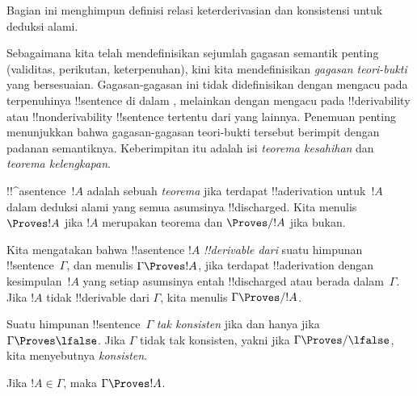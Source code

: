 \documentclass[../../../include/open-logic-section]{subfiles}
\begin{document}
      {}
      {}


\begin{editorial}
Bagian ini menghimpun definisi relasi keterderivasian dan konsistensi
untuk deduksi alami.
\end{editorial}

\begin{explain}
Sebagaimana kita telah mendefinisikan sejumlah gagasan semantik penting
(validitas, perikutan, keterpenuhan), kini kita mendefinisikan
\emph{gagasan teori-bukti} yang bersesuaian. Gagasan-gagasan ini tidak
didefinisikan dengan mengacu pada terpenuhinya !!{sentence} di dalam
, melainkan dengan mengacu pada
!!{derivability} atau !!{nonderivability} !!{sentence} tertentu dari
yang lainnya. Penemuan penting menunjukkan bahwa gagasan-gagasan
teori-bukti tersebut berimpit dengan padanan semantiknya. Keberimpitan itu
adalah isi \emph{teorema kesahihan} dan \emph{teorema kelengkapan}.
\end{explain}


\begin{defn}[Teorema]
!!^a{sentence}~$!A$ adalah sebuah \emph{teorema} jika terdapat
!!a{derivation} untuk~$!A$ dalam deduksi alami yang semua asumsinya
!!{discharged}. Kita menulis $\Proves !A$ jika $!A$ merupakan teorema dan
$\Proves/ !A$ jika bukan.
\end{defn}

\begin{defn}[!!^{derivability}]
Kita mengatakan bahwa !!a{sentence} $!A$ \emph{!!{derivable} dari} suatu
himpunan !!{sentence}~$\Gamma$, dan menulis $\Gamma \Proves !A$, jika
terdapat !!a{derivation} dengan kesimpulan~$!A$ yang setiap asumsinya
entah !!{discharged} atau berada dalam~$\Gamma$. Jika $!A$ tidak
!!{derivable} dari $\Gamma$, kita menulis $\Gamma \Proves/ !A$.
\end{defn}

\begin{defn}[Konsistensi]
Suatu himpunan !!{sentence}~$\Gamma$ \emph{tak konsisten} jika dan hanya
jika $\Gamma \Proves \lfalse$. Jika $\Gamma$ tidak tak konsisten, yakni
jika $\Gamma \Proves/ \lfalse$, kita menyebutnya \emph{konsisten}.
\end{defn}

\begin{prop}[Refleksivitas]
Jika $!A \in \Gamma$, maka $\Gamma \Proves !A$.
\end{prop}
\end{document}
